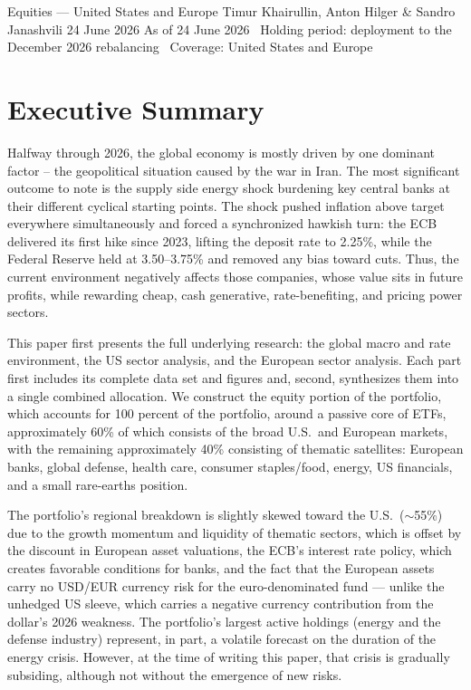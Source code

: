 \documentclass[11pt,a4paper]{article}
\begin{document}
%
{Equities --- United States and Europe}%
{Timur Khairullin, Anton Hilger \& Sandro Janashvili}%
{24 June 2026}%
{As of 24 June 2026 \textperiodcentered\ Holding period: deployment to the December 2026 rebalancing \textperiodcentered\ Coverage: United States and Europe}

\setcounter{tocdepth}{2}
\tableofcontents
\clearpage

\section*{Executive Summary}

Halfway through 2026, the global economy is mostly driven by one dominant factor -- the geopolitical situation caused by the war in Iran. The most significant outcome to note is the supply side energy shock burdening key central banks at their different cyclical starting points. The shock pushed inflation above target everywhere simultaneously and forced a synchronized hawkish turn: the ECB delivered its first hike since 2023, lifting the deposit rate to 2.25\%, while the Federal Reserve held at 3.50--3.75\% and removed any bias toward cuts. Thus, the current environment negatively affects those companies, whose value sits in future profits, while rewarding cheap, cash generative, rate-benefiting, and pricing power sectors.

This paper first presents the full underlying research: the global macro and rate environment, the US sector analysis, and the European sector analysis. Each part first includes its complete data set and figures and, second, synthesizes them into a single combined allocation. We construct the equity portion of the portfolio, which accounts for 100 percent of the portfolio, around a passive core of ETFs, approximately 60\% of which consists of the broad U.S.\ and European markets, with the remaining approximately 40\% consisting of thematic satellites: European banks, global defense, health care, consumer staples/food, energy, US financials, and a small rare-earths position.

The portfolio's regional breakdown is slightly skewed toward the U.S.\ (\(\sim\)55\%) due to the growth momentum and liquidity of thematic sectors, which is offset by the discount in European asset valuations, the ECB's interest rate policy, which creates favorable conditions for banks, and the fact that the European assets carry no USD/EUR currency risk for the euro-denominated fund --- unlike the unhedged US sleeve, which carries a negative currency contribution from the dollar's 2026 weakness. The portfolio's largest active holdings (energy and the defense industry) represent, in part, a volatile forecast on the duration of the energy crisis. However, at the time of writing this paper, that crisis is gradually subsiding, although not without the emergence of new risks.
\end{document}
